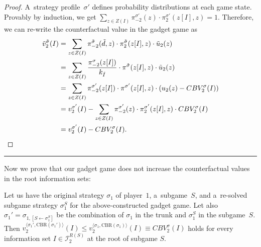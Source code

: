\begin{proof}
  A~strategy profile~$\sigma'$ defines probability distributions at each game state.
  Provably by induction, we get $\sum_{z\in Z(I)} \pi_{-2}^{\sigma'}(z) \cdot \pi_{2}^{\sigma'}(z[I], z) = 1$.
  Therefore, we can re-write the counterfactual value in the gadget game as
  \begin{equation*}
    \begin{split}
      \tilde{v}_2^{\tilde{\sigma}} (I)
      &= \sum_{z\in Z(I)}
      \pi_{-2}^{\tilde{\sigma}}(\tilde{d}, z) 
      \cdot \pi_{2}^{\tilde{\sigma}}(z[I], z)
      \cdot \tilde{u}_2(z) \\
      &= \sum_{z\in Z(I)}
      \frac{\pi_{-2}^{\sigma}(z[I])}{k_{\tilde{I}}}
      \cdot \pi^{\tilde{\sigma}}(z[I], z)
      \cdot \tilde{u}_2(z) \\
      &= \sum_{z\in Z(I)}
      \pi_{-2}^{\sigma'}(z[I])
      \cdot \pi^{\sigma'}(z[I], z)
      \cdot (u_2(z) - CBV_2^\sigma(I)) \\
      &= v_2^{\sigma'}(I) - \sum_{z\in Z(I)}
      \pi_{-2}^{\sigma'}(z) 
      \cdot \pi_{2}^{\sigma'}(z[I], z)
      \cdot CBV_2^\sigma(I) \\
      &= v_2 ^{\sigma'}(I) - CBV_2^\sigma(I).
    \end{split}
  \end{equation*}
\end{proof}

\color{purple}
\hrule

Now we prove that our gadget game does not increase the counterfactual values in the root information sets:
\begin{thm}
  \label{thm:cf-val-max-margin-gadget}
  Let us have the original strategy $\sigma_1$ of player~$1$, a~subgame~$S$, and a~re-solved subgame strategy $\sigma_1^S$ for the above-constructed gadget game.
  Let also $\sigma_1' = \sigma_{1, [S \leftarrow \sigma_1^S]}$ be the combination of $\sigma_1$ in the trunk and $\sigma_1^S$ in the subgame~$S$.
  Then $v_2^{\langle\sigma_1', \textrm{CBR}(\sigma_1')\rangle}(I) \leq  v_2^{\langle\sigma_1, \textrm{CBR}(\sigma_1)\rangle}(I) \equiv CBV_2^\sigma(I)$ holds for every information set $I\in\mathcal{I}_2^{R(S)}$ at the root of subgame $S$.
\end{thm}

